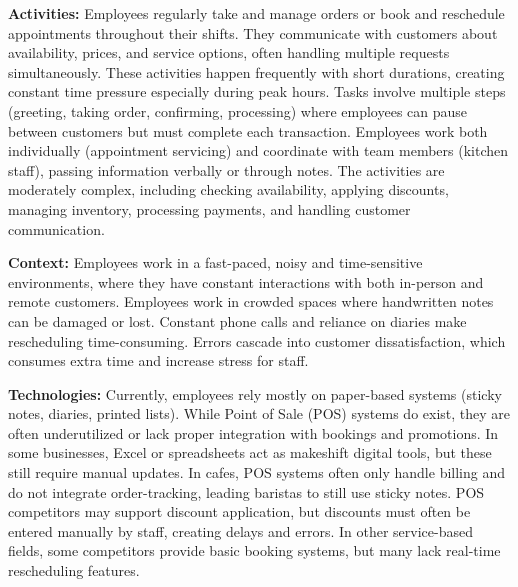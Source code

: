 \documentclass[]{VUMIFTemplateClass}
\begin{document}
    \textbf{Activities:} Employees regularly take and manage orders or book and
    reschedule appointments throughout their shifts. They communicate with customers
    about availability, prices, and service options, often handling multiple
    requests simultaneously. These activities happen frequently with short
    durations, creating constant time pressure especially during peak hours. Tasks
    involve multiple steps (greeting, taking order, confirming, processing) where
    employees can pause between customers but must complete each transaction.
    Employees work both individually (appointment servicing) and coordinate with team members (kitchen staff), passing
    information verbally or through notes. The activities are moderately complex, including checking availability, applying discounts, managing inventory, processing payments, and handling customer communication. 
    
    \textbf{Context:} Employees work in a fast-paced, noisy and time-sensitive
environments, where they have constant interactions with both in-person and remote customers. Employees work in crowded spaces where handwritten notes can be damaged or lost. Constant phone calls and reliance on diaries make rescheduling time-consuming. Errors cascade into customer dissatisfaction, which consumes extra time and increase stress for staff.
    
    \textbf{Technologies:} Currently, employees rely mostly on paper-based systems (sticky notes, diaries, printed lists). While Point of Sale (POS) systems do exist, they are often underutilized or lack proper integration with bookings and promotions. In some businesses, Excel or spreadsheets act as makeshift digital tools, but these still require manual updates. In cafes, POS systems often only handle billing and do not integrate order-tracking, leading baristas to still use sticky notes. POS competitors may support discount application, but discounts must often be entered manually by staff, creating delays and errors. In other service-based fields, some competitors provide basic booking systems, but many lack real-time rescheduling features. 
\end{document}
